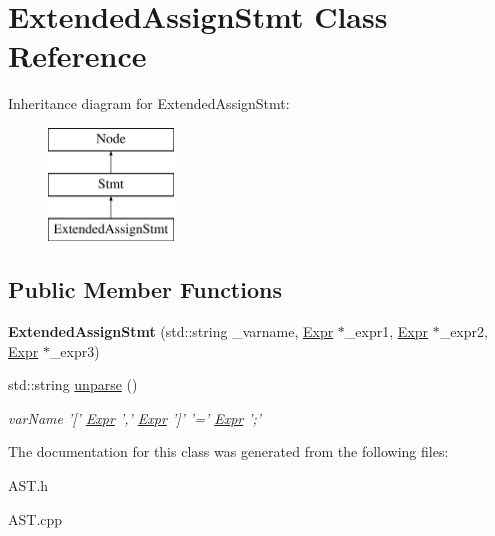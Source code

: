 \hypertarget{classExtendedAssignStmt}{\section{Extended\-Assign\-Stmt Class Reference}
\label{classExtendedAssignStmt}
}
Inheritance diagram for Extended\-Assign\-Stmt\-:\begin{figure}[H]
\begin{center}
\leavevmode
\includegraphics[height=3.000000cm]{classExtendedAssignStmt}
\end{center}
\end{figure}
\subsection*{Public Member Functions}
\begin{DoxyCompactItemize}
\item 
\hypertarget{classExtendedAssignStmt_a3623f072f66a39e54ed8c61ea72b0edf}{{\bfseries Extended\-Assign\-Stmt} (std\-::string \-\_\-varname, \hyperlink{classExpr}{Expr} $\ast$\-\_\-expr1, \hyperlink{classExpr}{Expr} $\ast$\-\_\-expr2, \hyperlink{classExpr}{Expr} $\ast$\-\_\-expr3)}\label{classExtendedAssignStmt_a3623f072f66a39e54ed8c61ea72b0edf}

\item 
\hypertarget{classExtendedAssignStmt_ab5437e004d97aa79df0a327dea7f93dc}{std\-::string \hyperlink{classExtendedAssignStmt_ab5437e004d97aa79df0a327dea7f93dc}{unparse} ()}\label{classExtendedAssignStmt_ab5437e004d97aa79df0a327dea7f93dc}

\begin{DoxyCompactList}\small\item\em var\-Name '\mbox{[}' \hyperlink{classExpr}{Expr} ',' \hyperlink{classExpr}{Expr} '\mbox{]}' '=' \hyperlink{classExpr}{Expr} ';' \end{DoxyCompactList}\end{DoxyCompactItemize}


The documentation for this class was generated from the following files\-:\begin{DoxyCompactItemize}
\item 
A\-S\-T.\-h\item 
A\-S\-T.\-cpp\end{DoxyCompactItemize}
